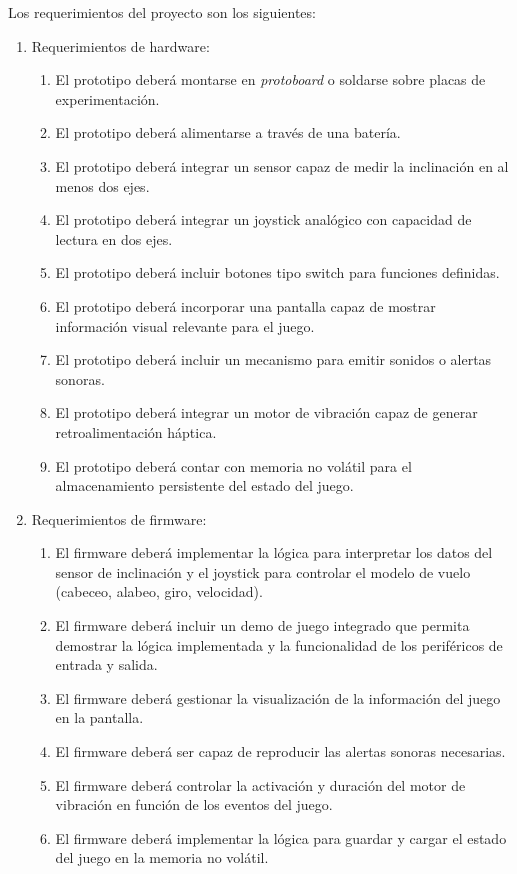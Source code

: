 \documentclass[
11pt, %
]{charter}
\begin{document}
Los requerimientos del proyecto son los siguientes:

\begin{enumerate}
	\item Requerimientos de hardware:
	\begin{enumerate}
		\item El prototipo deberá montarse en \textit{protoboard} o soldarse sobre placas de experimentación.
		\item El prototipo deberá alimentarse a través de una batería.
		\item El prototipo deberá integrar un sensor capaz de medir la inclinación en al menos dos ejes.
		\item El prototipo deberá integrar un joystick analógico con capacidad de lectura en dos ejes.
		\item El prototipo deberá incluir botones tipo switch para funciones definidas.
		\item El prototipo deberá incorporar una pantalla capaz de mostrar información visual relevante para el juego.
		\item El prototipo deberá incluir un mecanismo para emitir sonidos o alertas sonoras.
		\item El prototipo deberá integrar un motor de vibración capaz de generar retroalimentación háptica.
		\item El prototipo deberá contar con memoria no volátil para el almacenamiento persistente del estado del juego.
	\end{enumerate}
	\item Requerimientos de firmware:
	\begin{enumerate}
		\item El firmware deberá implementar la lógica para interpretar los datos del sensor de inclinación y el joystick para controlar el modelo de vuelo (cabeceo, alabeo, giro, velocidad).
		\item El firmware deberá incluir un demo de juego integrado que permita demostrar la lógica implementada y la funcionalidad de los periféricos de entrada y salida.
		\item El firmware deberá gestionar la visualización de la información del juego en la pantalla.
		\item El firmware deberá ser capaz de reproducir las alertas sonoras necesarias.
		\item El firmware deberá controlar la activación y duración del motor de vibración en función de los eventos del juego.
		\item El firmware deberá implementar la lógica para guardar y cargar el estado del juego en la memoria no volátil.

\end{enumerate}
\end{enumerate}
\end{document}
